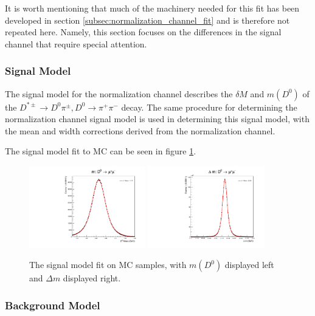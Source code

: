 It is worth mentioning that much of the machinery needed for this fit has been developed in section \ref{subsec:normalization_channel_fit} and is therefore not repeated here. Namely, this section focuses on the differences in the signal channel that require special attention.

\subsubsection{Signal Model}

The signal model for the normalization channel describes the $\delta M$ and $m(D^0)$ of the $D^{*\pm}\to D^0 \pi^\pm, D^0 \to \pi^+ \pi^-$ decay. The same procedure for determining the normalization channel signal model is used in determining this signal model, with the mean and width corrections derived from the normalization channel.

The signal model fit to MC can be seen in figure \ref{fig:d0mumu_uml_fit}.

\begin{figure}[htp]
    \begin{center}
      \includegraphics[width=0.45\textwidth]{figures/chapter4/signal_fit/d0mm_2022_2023_0_m.pdf}
      \includegraphics[width=0.45\textwidth]{figures/chapter4/signal_fit/d0mm_2022_2023_0_dm.pdf}\\
    \end{center}
    \caption{
      The signal model fit on MC samples, with $m(D^0)$ displayed left and $\Delta m$ displayed right.
    }
    \label{fig:d0mumu_uml_fit}
\end{figure}

\subsubsection{Background Model}

